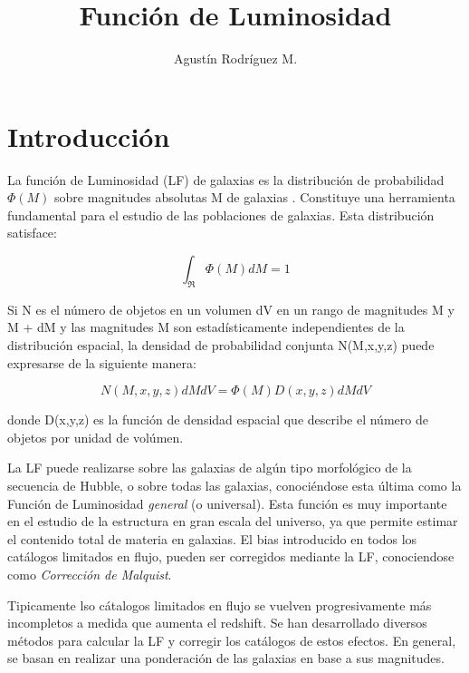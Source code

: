 \documentclass[a4paper,10pt]{article}
\title{Funci\'on de Luminosidad}
\author{Agustín Rodríguez M.}
\begin{document}
\maketitle

\begin{abstract}

\end{abstract}



\section{Introducci\'on}
La funci\'on de Luminosidad (LF) de galaxias es la distribuci\'on de probabilidad $\Phi(M)$ sobre magnitudes absolutas M de galaxias \citep{Binggeli1988}. Constituye una herramienta fundamental para el estudio de las poblaciones de galaxias. Esta distribuci\'on satisface: 

\begin{equation}
 \int_{\Re}\Phi(M)dM=1
\end{equation}

Si N es el n\'umero de objetos en un volumen dV en un rango de magnitudes M y M + dM y las magnitudes M son estad\'isticamente independientes de la distribuci\'on espacial, la densidad de probabilidad conjunta N(M,x,y,z) puede expresarse de la siguiente manera:

\begin{equation}
 N(M,x,y,z)dMdV=\Phi(M)D(x,y,z)dMdV
\end{equation}

donde D(x,y,z) es la funci\'on de densidad espacial que describe el n\'umero de objetos por unidad de vol\'umen. 





La LF puede realizarse sobre las galaxias de alg\'un tipo morfol\'ogico de la secuencia de Hubble, o sobre todas las galaxias, conoci\'endose esta \'ultima como la Funci\'on de Luminosidad \textit{general} (o universal). Esta funci\'on es muy importante en el estudio de la estructura en gran escala del universo, ya que permite estimar el contenido total de materia en galaxias. El bias introducido en todos los cat\'alogos limitados en flujo, pueden ser corregidos mediante la LF, conociendose como \textit{Correcci\'on de Malquist}.



Tipicamente lso c\'atalogos limitados en flujo se vuelven progresivamente m\'as incompletos a medida que aumenta el redshift. Se han desarrollado diversos m\'etodos para calcular la LF y corregir los cat\'alogos de estos efectos. En general, se basan en realizar una ponderaci\'on de las galaxias en base a sus magnitudes.
\end{document}
